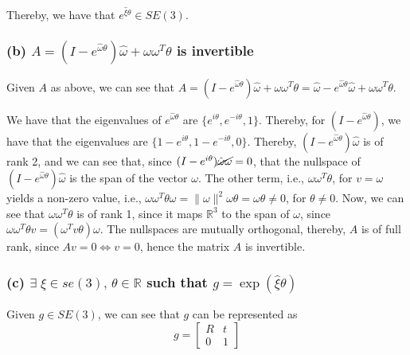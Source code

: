 Thereby, we have that \underline{\( e^{\hat{\xi} \theta} \in SE(3) \)}.

\clearpage
\subsubsection*{(b) \( A = \left(I-e^{\hat{\omega} \theta}\right) \hat{\omega}+\omega \omega^{T} \theta \) is invertible}

Given \( A \) as above, we can see that
\(
A
=
\left(I-e^{\hat{\omega} \theta}\right) \hat{\omega}+\omega \omega^{T} \theta
=
\hat{\omega} - e^{\hat{\omega} \theta} \hat{\omega} + \omega \omega^{T} \theta
\).

We have that the eigenvalues of \( e^{\hat{\omega} \theta} \) are \( \{ e^{i \theta}, e^{-i \theta}, 1 \} \).
Thereby, for \( (I - e^{\hat{\omega} \theta}) \), we have that the eigenvalues are \( \{ 1 - e^{i \theta}, 1 - e^{-i \theta}, 0 \} \).
Thereby, \( \left(I-e^{\hat{\omega} \theta}\right) \hat{\omega} \) is of rank 2, and we can see that, since \( (I - e^{i \theta}) \cancel{\hat{\omega} \omega} = 0 \), that the nullspace of \( \left(I-e^{\hat{\omega} \theta}\right) \hat{\omega} \) is the span of the vector \( \omega \).
The other term, i.e., \( \omega \omega^T \theta \), for \( v = \omega \) yields a non-zero value, i.e., \( \omega \omega^T \theta \omega = \lVert \omega \rVert^2 \omega \theta = \omega \theta \neq 0 \), for \( \theta \neq 0 \).
Now, we can see that \( \omega \omega^T \theta \) is of rank 1, since it maps \( \mathbb{R}^3 \) to the span of \( \omega \), since \( \omega \omega^T \theta v = (\omega^T v \theta) \omega \).
The nullspaces are mutually orthogonal, thereby, \( A \) is of full rank, since \( A v = 0 \iff v = 0 \), hence the matrix \( A \) is invertible.

\subsubsection*{(c) \( \exists \; \xi \in se(3), \, \theta \in \mathbb{R} \) such that \( g = \exp(\hat{\xi} \theta) \)}

Given \( g \in SE(3) \), we can see that \( g \) can be represented as
\begin{equation*}
      g
      =
      \begin{bmatrix}
            R & t \\
            0 & 1
      \end{bmatrix}
\end{equation*}

